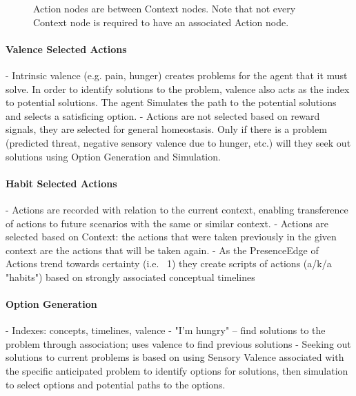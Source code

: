 \documentclass{article}
\begin{document}
\begin{figure}[ht]
{%
  }
  \caption{Action nodes are between Context nodes. Note that not every Context node is required to have an associated Action node.}
  \label{fig:action}
\end{figure}

\paragraph{Valence Selected Actions}
- Intrinsic valence (e.g. pain, hunger) creates problems for the agent that it must solve. In order to identify solutions to the problem, valence also acts as the index to potential solutions. The agent Simulates the path to the potential solutions and selects a satisficing option.
- Actions are not selected based on reward signals, they are selected for general homeostasis. Only if there is a problem (predicted threat, negative sensory valence due to hunger, etc.) will they seek out solutions using Option Generation and Simulation.

\paragraph{Habit Selected Actions}
- Actions are recorded with relation to the current context, enabling transference of actions to future scenarios with the same or similar context.
- Actions are selected based on Context: the actions that were taken previously in the given context are the actions that will be taken again.
- As the PresenceEdge of Actions trend towards certainty (i.e. ~1) they create scripts of actions (a/k/a "habits") based on strongly associated conceptual timelines

\paragraph{Option Generation}
- Indexes: concepts, timelines, valence
- "I'm hungry" -- find solutions to the problem through association; uses valence to find previous solutions
- Seeking out solutions to current problems is based on using Sensory Valence associated with the specific anticipated problem to identify options for solutions, then simulation to select options and potential paths to the options.
\end{document}
